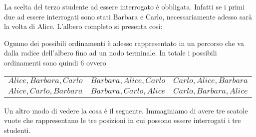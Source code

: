 \begin{center}
\end{center}

La scelta del terzo studente ad essere interrogato è obbligata. Infatti se i primi due ad essere interrogati sono stati Barbara e Carlo, necessariamente adesso sarà la volta di Alice. L'albero completo si presenta così:

\begin{center}
\end{center}

Ognuno dei possibili ordinamenti è adesso rappresentato in un percorso che va dalla radice dell'albero fino ad un nodo terminale. In totale i possibili ordinamenti sono quindi 6 ovvero

\begin{tabular}{ccc}
	$Alice, Barbara, Carlo$ & $Barbara, Alice, Carlo$ & $Carlo, Alice, Barbara$\\
	$Alice, Carlo, Barbara$ & $Barbara, Carlo,Alice$ & $Carlo, Barbara, Alice$\\
\end{tabular}

\vspace{.2cm}
Un altro modo di vedere la cosa è il seguente. Immaginiamo di avere tre scatole vuote che rappresentano le tre posizioni in cui possono essere interrogati i tre studenti.

